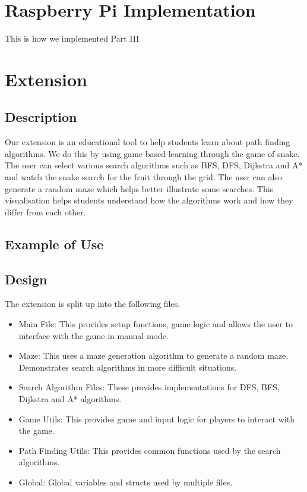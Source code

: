 \documentclass[11pt]{article}
\begin{document}
\section{Raspberry Pi Implementation}

This is how we implemented Part III

\section{Extension}

\subsection{Description}

Our extension is an educational tool to help students learn about path finding algorithms. 
We do this by using game based learning through the game of snake. The user can select various search algorithms 
such as BFS, DFS, Dijkstra and A* and watch the snake search for the fruit through the grid. 
The user can also generate a random maze which helps better illustrate some searches. 
This visualisation helps students understand how the algorithms work and how they differ from each other. 

\subsection{Example of Use}


\graphicspath{ {./images/} }


\subsection{Design}

The extension is split up into the following files.
\begin{itemize}
    \item Main File: This provides setup functions, game logic and allows the user to interface with the game in manual mode.
    \item Maze: This uses a maze generation algorithm to generate a random maze. Demonstrates search algorithms in more difficult situations.
    \item Search Algorithm Files: These provides implementations for DFS, BFS, Dijkstra and A* algorithms.
    \item Game Utils: This provides game and input logic for players to interact with the game.
    \item Path Finding Utils: This provides common functions used by the search algorithms.
    \item Global: Global variables and structs used by multiple files.
\end{itemize}
\end{document}
